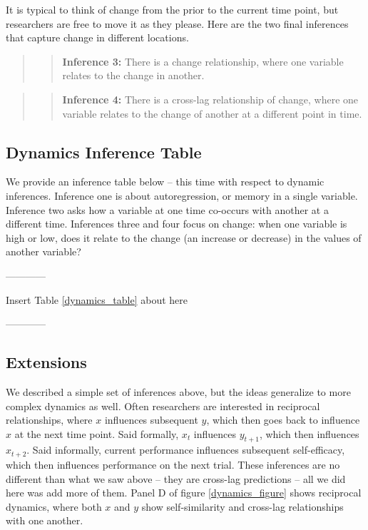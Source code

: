 \documentclass[english,,man]{apa6}
\theoremstyle{definition}
\theoremstyle{definition}
\theoremstyle{definition}
\theoremstyle{remark}
\begin{document}
It is typical to think of change from the prior to the current time
point, but researchers are free to move it as they please. Here are the
two final inferences that capture change in different locations.

\begin{quote}
\begin{quote}
\textbf{Inference 3:} There is a change relationship, where one variable
relates to the change in another.
\end{quote}
\end{quote}

\begin{quote}
\begin{quote}
\textbf{Inference 4:} There is a cross-lag relationship of change, where
one variable relates to the change of another at a different point in
time.
\end{quote}
\end{quote}

\hypertarget{dynamics-inference-table}{%
\subsection{Dynamics Inference Table}\label{dynamics-inference-table}}

We provide an inference table below -- this time with respect to dynamic
inferences. Inference one is about autoregression, or memory in a single
variable. Inference two asks how a variable at one time co-occurs with
another at a different time. Inferences three and four focus on change:
when one variable is high or low, does it relate to the change (an
increase or decrease) in the values of another variable?

\begin{center}

------------

Insert Table \ref{dynamics_table} about here

------------

\end{center}

\hypertarget{extensions}{%
\subsection{Extensions}\label{extensions}}

We described a simple set of inferences above, but the ideas generalize
to more complex dynamics as well. Often researchers are interested in
reciprocal relationships, where \(x\) influences subsequent \(y\), which
then goes back to influence \(x\) at the next time point. Said formally,
\(x_t\) influences \(y_{t+1}\), which then influences \(x_{t+2}\). Said
informally, current performance influences subsequent self-efficacy,
which then influences performance on the next trial. These inferences
are no different than what we saw above -- they are cross-lag
predictions -- all we did here was add more of them. Panel D of figure
\ref{dynamics_figure} shows reciprocal dynamics, where both \(x\) and
\(y\) show self-similarity and cross-lag relationships with one another.
\end{document}
